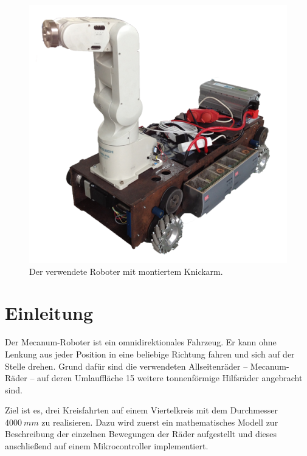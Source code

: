 \begin{figure}
    \centering
    \includegraphics[width=.9\textwidth]{Abbildungen/Roboter}
    \caption{Der verwendete Roboter mit montiertem Knickarm.}
\end{figure}
\newpage

\section{Einleitung}
Der Mecanum-Roboter ist ein omnidirektionales Fahrzeug. Er kann ohne Lenkung aus jeder Position in eine beliebige Richtung fahren und sich auf der Stelle drehen.
Grund dafür sind die verwendeten Allseitenräder -- Mecanum-Räder -- auf deren Umlauffläche 15 weitere tonnenförmige Hilfsräder angebracht sind.

Ziel ist es, drei Kreisfahrten auf einem Viertelkreis mit dem Durchmesser $4000~mm$ zu realisieren.
Dazu wird zuerst ein mathematisches Modell zur Beschreibung der einzelnen Bewegungen der Räder aufgestellt und dieses anschließend auf einem Mikrocontroller implementiert.


